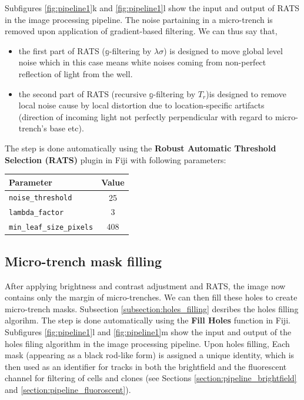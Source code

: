 \documentclass[pdftex,12pt,a4paper]{report}
\begin{document}
Subfigures \ref{fig:pipeline1}k and \ref{fig:pipeline1}l show the input and output of  RATS in the image processing pipeline. The noise partaining in a micro-trench is removed upon application of gradient-based filtering. We can thus say that,

\begin{itemize}
\item the first part of RATS ($\mathbb{g}$-filtering by $\lambda \sigma$) is designed to move global level noise  which in this case means white noises coming from non-perfect reflection of light from the well.
\item the second part of RATS (recursive $\mathbb{g}$-filtering by $T_r$)is designed to remove local noise cause by local distortion due to location-specific artifacts (direction of incoming light not perfectly perpendicular with regard to micro-trench's base etc).
\end{itemize}

The step is done automatically using the \textbf{Robust Automatic Threshold Selection (RATS)} plugin in Fiji with following parameters:

\begin{table}[H]
\centering
\begin{tabular}[t]{ l | c }
\hline
Parameter & Value \\
\hline\hline
\texttt{noise\_threshold} & 25 \\
\texttt{lambda\_factor} & 3 \\
\texttt{min\_leaf\_size\_pixels} & 408 \\
\end{tabular}
\end{table}

\subsection{Micro-trench mask filling}

After applying brightness and contrast adjustment and RATS, the image now contains only the margin of micro-trenches. We can then fill these holes to create micro-trench masks. Subsection \ref{subsection:holes_filling} desribes the holes filling algorihm. The step is done automatically using the \textbf{Fill Holes} function in Fiji. Subfigures \ref{fig:pipeline1}l and \ref{fig:pipeline1}m show the input and output of the holes filing algorithm in the image processing pipeline. Upon holes filling, Each mask (appearing as a black rod-like form) is assigned a unique identity, which is then used as an identifier for tracks in both the brightfield and the fluorescent channel for filtering of cells and clones (see Sections \ref{section:pipeline_brightfield} and \ref{section:pipeline_fluoroscent}).
\end{document}
